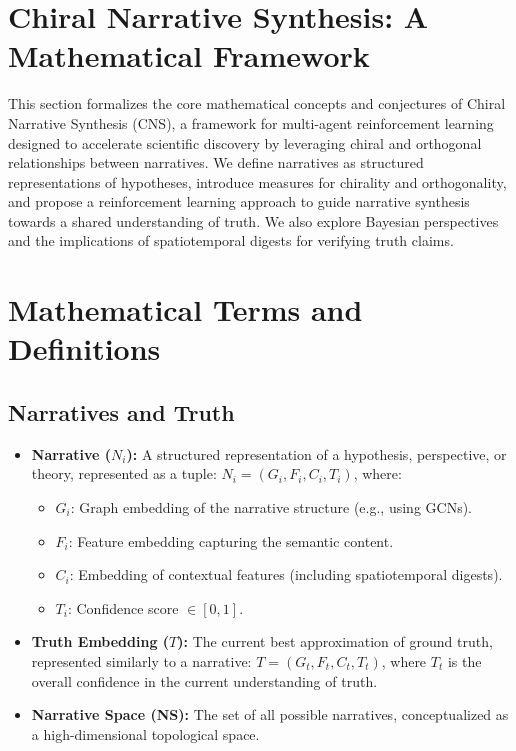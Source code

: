 \documentclass[12pt, a4paper]{article}
\begin{document}
\section{Chiral Narrative Synthesis: A Mathematical Framework}


This section formalizes the core mathematical concepts and conjectures of Chiral Narrative Synthesis (CNS), a framework for multi-agent reinforcement learning designed to accelerate scientific discovery by leveraging chiral and orthogonal relationships between narratives.  We define narratives as structured representations of hypotheses, introduce measures for chirality and orthogonality, and propose a reinforcement learning approach to guide narrative synthesis towards a shared understanding of truth.  We also explore Bayesian perspectives and the implications of spatiotemporal digests for verifying truth claims.


\section{Mathematical Terms and Definitions}

\subsection{Narratives and Truth}

\begin{itemize}
    \item \textbf{Narrative ($N_i$): } A structured representation of a hypothesis, perspective, or theory, represented as a tuple: $N_i = (G_i, F_i, C_i, T_i)$, where:
        \begin{itemize}
            \item $G_i$: Graph embedding of the narrative structure (e.g., using GCNs).
            \item $F_i$: Feature embedding capturing the semantic content.
            \item $C_i$: Embedding of contextual features (including spatiotemporal digests).
            \item $T_i$: Confidence score $\in [0, 1]$.
        \end{itemize}
    \item \textbf{Truth Embedding ($T$): }  The current best approximation of ground truth, represented similarly to a narrative: $T = (G_t, F_t, C_t, T_t)$, where $T_t$ is the overall confidence in the current understanding of truth.
    \item \textbf{Narrative Space (NS): } The set of all possible narratives, conceptualized as a high-dimensional topological space.
\end{itemize}
\end{document}

